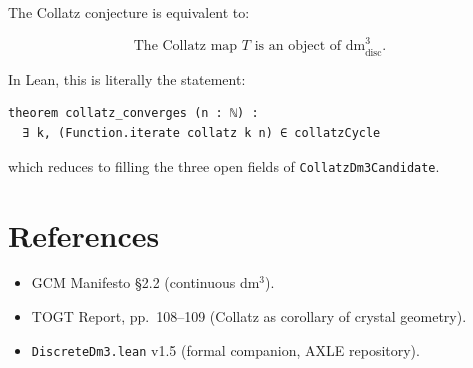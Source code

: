 \documentclass[11pt]{article}
\begin{document}
The Collatz conjecture is equivalent to:



\[
\text{The Collatz map } T \text{ is an object of dm}^3_{\mathrm{disc}}.
\]



In Lean, this is literally the statement:

\begin{verbatim}
theorem collatz_converges (n : ℕ) :
  ∃ k, (Function.iterate collatz k n) ∈ collatzCycle
\end{verbatim}

which reduces to filling the three open fields of
\texttt{CollatzDm3Candidate}.

\section{References}

\begin{itemize}
  \item GCM Manifesto \S2.2 (continuous dm$^3$).
  \item TOGT Report, pp.~108--109 (Collatz as corollary of crystal geometry).
  \item \texttt{DiscreteDm3.lean} v1.5 (formal companion, AXLE repository).
\end{itemize}
\end{document}
